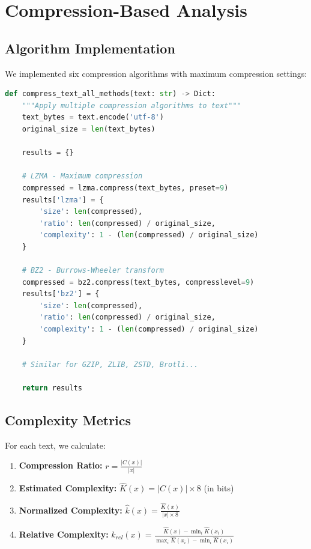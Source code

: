 \documentclass[12pt,a4paper]{report}
\begin{document}
\section{Compression-Based Analysis}

\subsection{Algorithm Implementation}

We implemented six compression algorithms with maximum compression settings:

\begin{lstlisting}[language=Python, caption=Compression Implementation]
def compress_text_all_methods(text: str) -> Dict:
    """Apply multiple compression algorithms to text"""
    text_bytes = text.encode('utf-8')
    original_size = len(text_bytes)

    results = {}

    # LZMA - Maximum compression
    compressed = lzma.compress(text_bytes, preset=9)
    results['lzma'] = {
        'size': len(compressed),
        'ratio': len(compressed) / original_size,
        'complexity': 1 - (len(compressed) / original_size)
    }

    # BZ2 - Burrows-Wheeler transform
    compressed = bz2.compress(text_bytes, compresslevel=9)
    results['bz2'] = {
        'size': len(compressed),
        'ratio': len(compressed) / original_size,
        'complexity': 1 - (len(compressed) / original_size)
    }

    # Similar for GZIP, ZLIB, ZSTD, Brotli...

    return results
\end{lstlisting}

\subsection{Complexity Metrics}

For each text, we calculate:

\begin{enumerate}
    \item \textbf{Compression Ratio:} $r = \frac{|C(x)|}{|x|}$
    \item \textbf{Estimated Complexity:} $\hat{K}(x) = |C(x)| \times 8$ (in bits)
    \item \textbf{Normalized Complexity:} $\hat{k}(x) = \frac{\hat{K}(x)}{|x| \times 8}$
    \item \textbf{Relative Complexity:} $k_{rel}(x) = \frac{\hat{K}(x) - \min_i\hat{K}(x_i)}{\max_i\hat{K}(x_i) - \min_i\hat{K}(x_i)}$
\end{enumerate}
\end{document}
